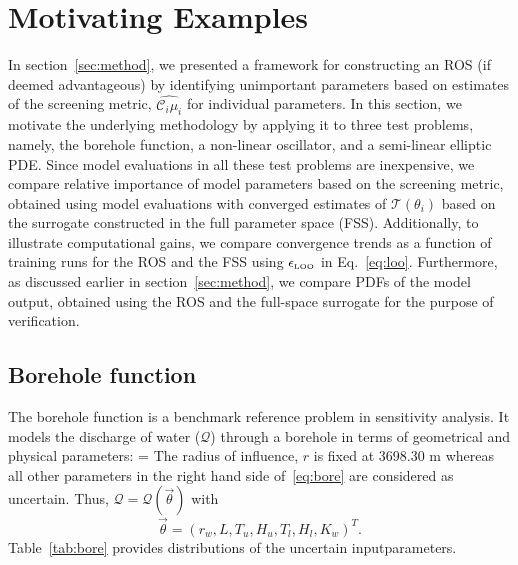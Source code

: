\section{Motivating Examples}
\label{sec:examples}

In section~\ref{sec:method}, we presented a framework for constructing
an ROS (if deemed advantageous) by identifying unimportant parameters based on 
estimates of the screening metric, $\widehat{\mathcal{C}_i\mu_i}$
for individual parameters.
In this section, we motivate the underlying methodology by applying it to three test problems,
namely, the borehole function, a non-linear oscillator, and a semi-linear elliptic PDE.
Since model evaluations in all these test
problems are inexpensive, we compare relative importance of model parameters based
on the screening metric, obtained using model evaluations with 
converged estimates of $\mathcal{T}(\theta_i)$ based on the surrogate constructed in the
full parameter space (FSS). Additionally, to illustrate computational gains, we compare
convergence trends as a function of training runs for the ROS and the FSS using 
$\epsilon_{\mbox{\tiny LOO}}$ in Eq.~\ref{eq:loo}. 
Furthermore, as discussed earlier in section~\ref{sec:method}, we compare
PDFs of the model output, obtained using the ROS and the full-space surrogate for
the purpose of verification. 

\subsection{Borehole function}

The borehole function is a benchmark reference problem in sensitivity analysis.
It models the discharge of water ($\mathcal{Q}$) through a borehole in terms of
geometrical and physical parameters:
\be
{} = 
\label{eq:bore}
\ee
The radius of influence, $r$ is fixed at 3698.30 m whereas all other parameters
in the right hand side of~\eqref{eq:bore} are considered 
as uncertain. Thus, $\mathcal{Q} = \mathcal{Q}(\vec{\theta})$ with 
\[
   \vec{\theta} = (r_w, L, T_u, H_u, T_l, H_l, K_w)^T.
\] 
Table~\ref{tab:bore} provides distributions of the uncertain inputparameters. 

